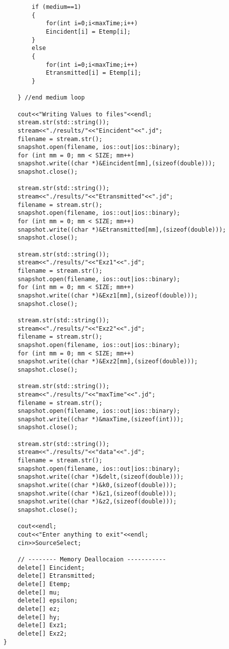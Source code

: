 \begin{lstlisting}
		if (medium==1)
		{
			for(int i=0;i<maxTime;i++)
			Eincident[i] = Etemp[i];
		}
		else
		{
			for(int i=0;i<maxTime;i++)
			Etransmitted[i] = Etemp[i];
		}
		
	} //end medium loop
	
	cout<<"Writing Values to files"<<endl;
	stream.str(std::string());
	stream<<"./results/"<<"Eincident"<<".jd";
	filename = stream.str();
	snapshot.open(filename, ios::out|ios::binary);
	for (int mm = 0; mm < SIZE; mm++)
	snapshot.write((char *)&Eincident[mm],(sizeof(double)));
	snapshot.close();

	stream.str(std::string());
	stream<<"./results/"<<"Etransmitted"<<".jd";
	filename = stream.str();
	snapshot.open(filename, ios::out|ios::binary);
	for (int mm = 0; mm < SIZE; mm++)
	snapshot.write((char *)&Etransmitted[mm],(sizeof(double)));
	snapshot.close();

	stream.str(std::string());
	stream<<"./results/"<<"Exz1"<<".jd";
	filename = stream.str();
	snapshot.open(filename, ios::out|ios::binary);
	for (int mm = 0; mm < SIZE; mm++)
	snapshot.write((char *)&Exz1[mm],(sizeof(double)));
	snapshot.close();

	stream.str(std::string());
	stream<<"./results/"<<"Exz2"<<".jd";
	filename = stream.str();
	snapshot.open(filename, ios::out|ios::binary);
	for (int mm = 0; mm < SIZE; mm++)
	snapshot.write((char *)&Exz2[mm],(sizeof(double)));
	snapshot.close();

	stream.str(std::string());
	stream<<"./results/"<<"maxTime"<<".jd";
	filename = stream.str();
	snapshot.open(filename, ios::out|ios::binary);
	snapshot.write((char *)&maxTime,(sizeof(int)));
	snapshot.close();

	stream.str(std::string());
	stream<<"./results/"<<"data"<<".jd";
	filename = stream.str();
	snapshot.open(filename, ios::out|ios::binary);
	snapshot.write((char *)&delt,(sizeof(double)));
	snapshot.write((char *)&k0,(sizeof(double)));
	snapshot.write((char *)&z1,(sizeof(double)));
	snapshot.write((char *)&z2,(sizeof(double)));
	snapshot.close();

	cout<<endl;
	cout<<"Enter anything to exit"<<endl;
	cin>>SourceSelect;

	// -------- Memory Deallocaion -----------
	delete[] Eincident;
	delete[] Etransmitted;
	delete[] Etemp;
	delete[] mu;
	delete[] epsilon;
	delete[] ez;
	delete[] hy;
	delete[] Exz1;
	delete[] Exz2;
}
\end{lstlisting}

